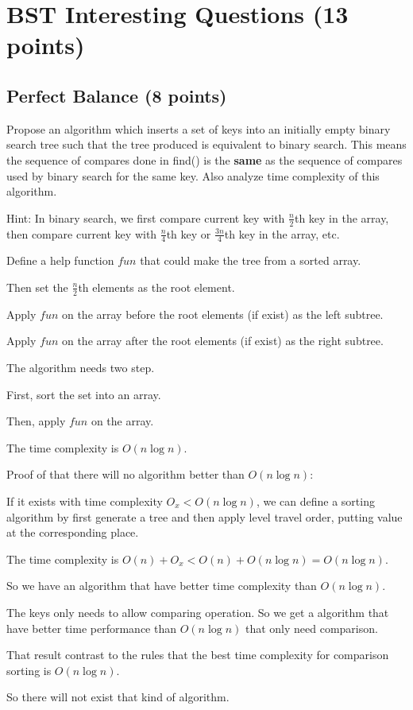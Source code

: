 \documentclass[11pt]{exam}
\begin{document}
\newpage
\section{BST Interesting Questions (13 points)}
\subsection{Perfect Balance (8 points)}
Propose an algorithm which inserts a set of keys into an initially empty binary search tree such that the tree produced is equivalent to binary search. This means the sequence of compares done in find() is the \textbf{same} as the sequence of compares used by binary search for the same key. Also analyze time complexity of this algorithm.

Hint: In binary search, we first compare current key with $\frac{n}{2}$th key in the array, then compare current key with $\frac{n}{4}$th key or $\frac{3n}{4}$th key in the array, etc.

\begin{solution}

    Define a help function $fun$ that could make the tree from a sorted array.

    Then set the $\frac{n}{2}$th elements as the root element.

    Apply $fun$ on the array before the root elements (if exist) as the left subtree.

    Apply $fun$ on the array after the root elements (if exist) as the right subtree.

    The algorithm needs two step.

    First, sort the set into an array.

    Then, apply $fun$ on the array.

    The time complexity is $O(n \log n)$.

    Proof of that there will no algorithm better than $O(n \log n)$:

    If it exists with time complexity $O_x<O(n \log n)$, we can define a sorting algorithm by first generate a tree and then apply level travel order, putting value at the corresponding place.

    The time complexity is $O(n)+O_x<O(n)+O(n \log n) = O(n \log n)$.

    So we have an algorithm that have better time complexity than $O(n \log n)$.

    The keys only needs to allow comparing operation. So we get a algorithm that have better time performance than $O(n \log n)$ that only need comparison.

    That result contrast to the rules that the best time complexity for comparison sorting is $O(n \log n)$.

    So there will not exist that kind of algorithm.

\end{solution}
\end{document}
